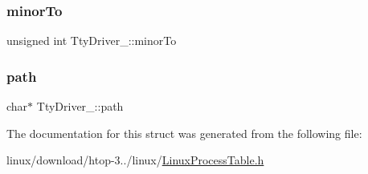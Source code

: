 \mbox{\label{structTtyDriver___aeebb092707677fdb1d8a09f5eeeaa882}} 
\subsubsection{\texorpdfstring{minor\+To}{minorTo}}
{\footnotesize\ttfamily unsigned int Tty\+Driver\+\_\+\+::minor\+To}

\mbox{\label{structTtyDriver___a98edd75a405aa89b6b7a5ea2e0f0d2bd}} 
\subsubsection{\texorpdfstring{path}{path}}
{\footnotesize\ttfamily char$\ast$ Tty\+Driver\+\_\+\+::path}



The documentation for this struct was generated from the following file\+:\begin{DoxyCompactItemize}
\item 
linux/download/htop-\/3../linux/\hyperlink{LinuxProcessTable_8h}{Linux\+Process\+Table.\+h}\end{DoxyCompactItemize}
